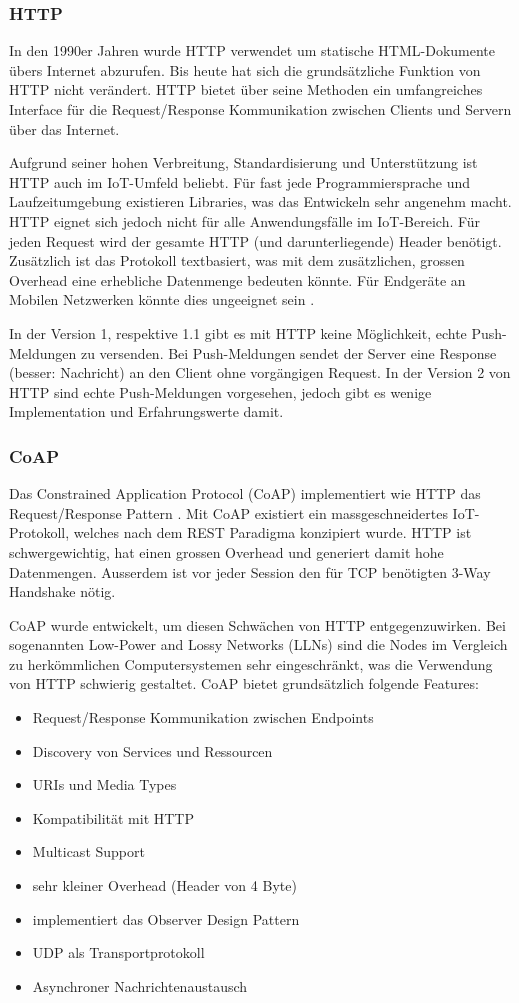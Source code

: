 \subsubsection{HTTP}
In den 1990er Jahren wurde HTTP verwendet um statische HTML-Dokumente übers Internet abzurufen. Bis heute hat sich die grundsätzliche Funktion von HTTP nicht verändert. HTTP bietet über seine Methoden ein umfangreiches Interface für die Request/Response Kommunikation zwischen Clients und Servern über das Internet. 

Aufgrund seiner hohen Verbreitung, Standardisierung und Unterstützung ist HTTP auch im IoT-Umfeld beliebt. Für fast jede Programmiersprache und Laufzeitumgebung existieren Libraries, was das Entwickeln sehr angenehm macht. HTTP eignet sich jedoch nicht für alle Anwendungsfälle im IoT-Bereich. Für jeden Request wird der gesamte HTTP (und darunterliegende) Header benötigt. Zusätzlich ist das Protokoll textbasiert, was mit dem zusätzlichen, grossen Overhead eine erhebliche Datenmenge bedeuten könnte. Für Endgeräte an Mobilen Netzwerken könnte dies ungeeignet sein \cite{Obermaier15}.

In der Version 1, respektive 1.1 gibt es mit HTTP keine Möglichkeit, echte Push-Meldungen zu versenden. Bei Push-Meldungen sendet der Server eine Response (besser: Nachricht) an den Client ohne vorgängigen Request. In der Version 2 von HTTP sind echte Push-Meldungen vorgesehen, jedoch gibt es wenige Implementation und Erfahrungswerte damit.
\subsubsection{CoAP}
\label{sec:iotkomm}
Das Constrained Application Protocol (CoAP) implementiert wie HTTP das Request/Response Pattern \cite{Obermaier15}. Mit CoAP existiert ein massgeschneidertes IoT-Protokoll, welches nach dem REST Paradigma konzipiert wurde. HTTP ist schwergewichtig, hat einen grossen Overhead und generiert damit hohe Datenmengen. Ausserdem ist vor jeder Session den für TCP benötigten 3-Way Handshake nötig. 
 
CoAP wurde entwickelt, um diesen Schwächen von HTTP entgegenzuwirken. Bei sogenannten Low-Power and Lossy Networks (LLNs) sind die Nodes im Vergleich zu herkömmlichen Computersystemen sehr eingeschränkt, was die Verwendung von HTTP schwierig gestaltet. CoAP bietet grundsätzlich folgende Features:\cite{RFC7252}
\begin{itemize}
\item Request/Response Kommunikation zwischen Endpoints	
\item Discovery von Services und Ressourcen
\item URIs und Media Types
\item Kompatibilität mit HTTP
\item Multicast Support
\item sehr kleiner Overhead (Header von 4 Byte)
\item implementiert das Observer Design Pattern
\item UDP als Transportprotokoll
\item Asynchroner Nachrichtenaustausch
\end{itemize}
 
